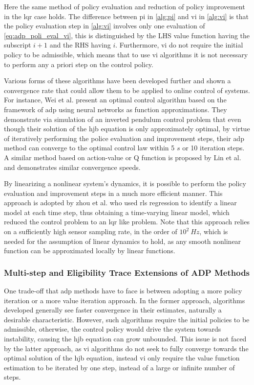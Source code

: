 \documentclass[../report.tex]{subfiles}
\begin{document}
Here the same method of policy evaluation and reduction of policy improvement in the \ac{lqr} case holds. The difference between \ac{pi} in \autoref{alg:pi} and \ac{vi} in \autoref{alg:vi} is that the policy evaluation step in \autoref{alg:vi} involves only one evaluation of \autoref{eq:adp_poli_eval_vi}, this is distinguished by the LHS value function having the subscript $i+1$ and the RHS having $i$. Furthermore, \ac{vi} do not require the initial policy to be admissible, which means that to use \ac{vi} algorithms it is not necessary to perform any a priori step on the control policy.

Various forms of these algorithms have been developed further and shown a convergence rate that could allow them to be applied to online control of systems. For instance, Wei et al. \cite{wei_adp} present an optimal control algorithm based on the framework of \ac{adp} using neural networks as function approximations. They demonstrate via simulation of an inverted pendulum control problem that even though their solution of the \ac{hjb} equation is only approximately optimal, by virtue of iteratively performing the police evaluation and improvement steps, their \ac{adp} method can converge to the optimal control law within 5 $s$ or 10 iteration steps. A similar method based on action-value or Q function is proposed by Lin et al. \cite{lin_adp_unknown_system} and demonstrates similar convergence speeds. 

By linearizing a nonlinear system's dynamics, it is possible to perform the policy evaluation and improvement steps in a much more efficient manner. This approach is adopted by zhou et al. \cite{zhou_iadp_1,zhou_iadp_2} who used \ac{rls} regression to identify a linear model at each time step, thus obtaining a time-varying linear model, which reduced the control problem to an \ac{lqr} like problem. Note that this approach relies on a sufficiently high sensor sampling rate, in the order of $10^2\ Hz$, which is needed for the assumption of linear dynamics to hold, as any smooth nonlinear function can be approximated locally by linear functions.

\subsubsection{Multi-step and Eligibility Trace Extensions of ADP Methods}

One trade-off that \ac{adp} methods have to face is between adopting a more policy iteration or a more value iteration approach. In the former approach, algorithms developed generally see faster convergence in their estimates, naturally a desirable characteristic. However, such algorithms require the initial policies to be admissible, otherwise, the control policy would drive the system towards instability, causing the \ac{hjb} equation can grow unbounded. This issue is not faced by the latter approach, as \ac{vi} algorithms do not seek to fully converge towards the optimal solution of the \ac{hjb} equation, instead \ac{vi} only require the value function estimation to be iterated by one step, instead of a large or infinite number of steps.
\end{document}

